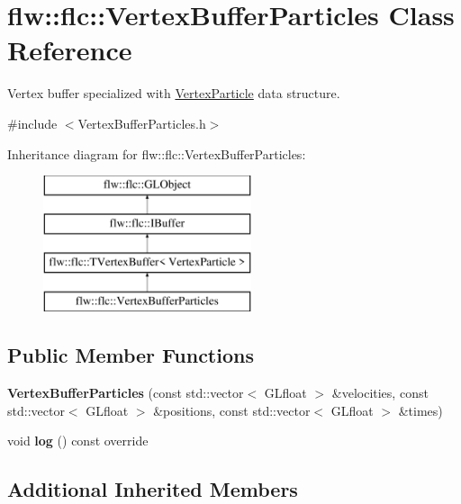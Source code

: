 \hypertarget{classflw_1_1flc_1_1VertexBufferParticles}{}\section{flw\+:\+:flc\+:\+:Vertex\+Buffer\+Particles Class Reference}
\label{classflw_1_1flc_1_1VertexBufferParticles}


Vertex buffer specialized with \hyperlink{structflw_1_1flc_1_1VertexParticle}{Vertex\+Particle} data structure.  




{\ttfamily \#include $<$Vertex\+Buffer\+Particles.\+h$>$}

Inheritance diagram for flw\+:\+:flc\+:\+:Vertex\+Buffer\+Particles\+:\begin{figure}[H]
\begin{center}
\leavevmode
\includegraphics[height=4.000000cm]{classflw_1_1flc_1_1VertexBufferParticles}
\end{center}
\end{figure}
\subsection*{Public Member Functions}
\begin{DoxyCompactItemize}
\item 
\mbox{\label{classflw_1_1flc_1_1VertexBufferParticles_a80c9a81b788b02bf4968cbea21168d5e}} 
{\bfseries Vertex\+Buffer\+Particles} (const std\+::vector$<$ G\+Lfloat $>$ \&velocities, const std\+::vector$<$ G\+Lfloat $>$ \&positions, const std\+::vector$<$ G\+Lfloat $>$ \&times)
\item 
\mbox{\label{classflw_1_1flc_1_1VertexBufferParticles_a2a4bd9b4f1e6a9ceae2988e2a9d14602}} 
void {\bfseries log} () const override
\end{DoxyCompactItemize}
\subsection*{Additional Inherited Members}


